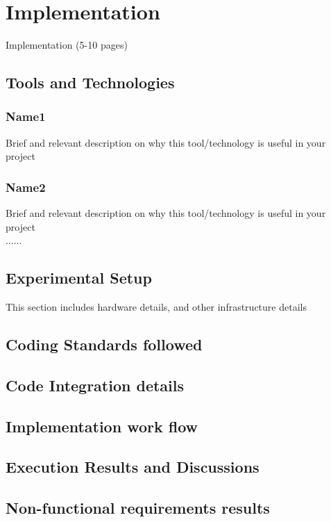 \chapter{Implementation}
\graphicspath{{Implementation/ImplementationFigs/EPS/}{Implementation/ImplementationFigs/}}

Implementation (5-10 pages)
\section{Tools and Technologies}
\subsection{Name1}
Brief and relevant description on why this tool/technology is useful in your project
\subsection{Name2}
Brief and relevant description on why this tool/technology is useful in your project\\
......
\section{Experimental Setup}
	This section includes hardware details, and other infrastructure details
\section{Coding Standards followed}
\section{Code Integration details}
\section{Implementation work flow}
\section{Execution Results and Discussions}
\section{Non-functional requirements results}



